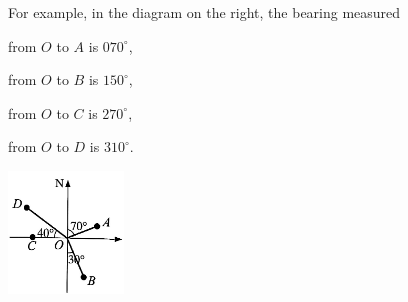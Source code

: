 \documentclass{report}
\begin{document}
   \begin{vwcol}[widths={0.7,0.3}, sep=8mm, rule=0pt]
         For example, in the diagram on the right, the bearing measured
    
    \noindent from $O$ to $A$ is $070^\circ$, 
    
    \noindent from $O$ to $B$ is $150^\circ$, 
    
    \noindent from $O$ to $C$ is $270^\circ$, 
    
    \noindent from $O$ to $D$ is $310^\circ$.

    \includegraphics[width=0.23\textwidth]{assets/10-65.jpg}
   \end{vwcol}
\end{document}
